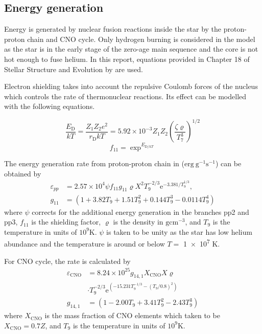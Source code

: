 \documentclass[twocolumn]{aastex631}
\begin{document}
\subsection{Energy generation}
\label{subsec:energy_generation}
Energy is generated by nuclear fusion reactions inside the star by the proton-proton chain and CNO cycle. Only hydrogen burning is considered in the model as the star is in the early stage of the zero-age main sequence and the core is not hot enough to fuse helium.
In this report, equations provided in Chapter 18 of Stellar Structure and Evolution by \cite{book:StellarStructureEvolution} are used.

Electron shielding takes into account the repulsive Coulomb forces of the nucleus which controls the rate of thermonuclear reactions. Its effect can be modelled with the following equations.

\begin{equation}
	\frac{E_{\mathrm{D}}}{k T}=\frac{Z_1 Z_2 e^2}{r_{\mathrm{D}} k T}=5.92 \times 10^{-3} Z_1 Z_2\left(\frac{\zeta \varrho}{T_7^3}\right)^{1 / 2}
\end{equation}
\begin{equation}
	f_{11} =  \exp^{E_{\mathrm{D} / kT}}
\end{equation}

The energy generation rate from proton-proton chain in ($\mathrm{erg ~ g^{-1} s^{-1}}$) can be obtained by
\begin{align}
	\varepsilon_{p p} & = 2.57 \times 10^4 \psi f_{11} g_{11} \varrho X^2 T_9^{-2 / 3} \mathrm{e}^{-3.381 / T_9^{1 / 3}}, \\
	g_{11}            & = \left(1+3.82 T_9+1.51 T_9^2+0.144 T_9^3-0.0114 T_9^4\right)
\end{align}
where $\psi$ corrects for the additional energy generation in the branches pp2 and pp3, $f_{11}$ is the shielding factor, $\varrho$ is the density in $\mathrm{g cm^{-3}}$, and $T_9$ is the temperature in units of $10^9$K. $\psi$ is taken to be unity as the star has low helium abundance and the temperature is around or below $T=$ \num{1e7} K.

For CNO cycle, the rate is calculated by
\begin{align}
	\varepsilon_{\mathrm{CNO}} & = 8.24 \times 10^{25} g_{14,1} X_{\mathrm{CNO}} X \varrho \nonumber \\
	&  \cdot T_9^{-2 / 3} \mathrm{e}^{\left(-15.231 T_9^{-1 / 3}-\left(T_9 / 0.8\right)^2\right)} \\
	g_{14,1}                   & =\left(1-2.00 T_9+3.41 T_9^2-2.43 T_9^3\right)
\end{align}
where $X_{\mathrm{CNO}}$ is the mass fraction of CNO elements which taken to be $X_{\mathrm{CNO}} = 0.7 Z$, and $T_9$ is the temperature in units of $10^9$K.
\end{document}
